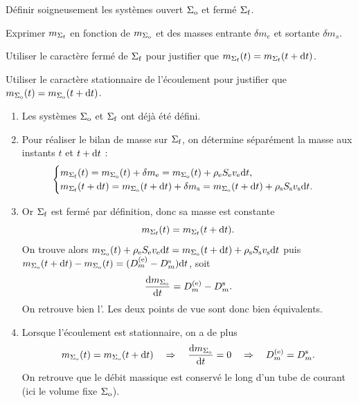 \documentclass[12pt,fancy]{cours}
\begin{document}

\begin{methode}
	\item Définir soigneusement les systèmes ouvert $\Sigma_{\rm o}$ et fermé $\Sigma_{\rm f}$.
	\item Exprimer $m_{\Sigma_{\rm f}}$ en fonction de $m_{\Sigma_{\rm o}}$ et des masses entrante $\delta m_e$ et sortante $\delta m_s$.
	\item Utiliser le caractère fermé de $\Sigma_{\rm f}$ pour justifier que $m_{\Sigma_{\rm f}}(t)= m_{\Sigma_{\rm f}}(t+\mathrm{d} t)$.
	\item Utiliser le caractère stationnaire de l'écoulement pour justifier que $m_{\Sigma_{\rm o}}(t)= m_{\Sigma_{\rm o}}(t+\mathrm{d} t)$.
\end{methode}
\begin{enumerate}
	\item Les systèmes $\Sigma_{\rm o}$ et $\Sigma_{\rm f}$ ont déjà été défini.
	\item Pour réaliser le bilan de masse sur $\Sigma_{\rm f}$, on détermine séparément la masse aux instants $t$ et $t+\mathrm{d} t$ : %
	\begin{equation}
	\begin{cases}
	m_{\Sigma_{\rm f}}(t)=m_{\Sigma_{\rm o}}(t)+\delta m_{\rm{e}}=m_{\Sigma_{\rm o}}(t)+\rho_{\rm{e}}S_{\rm{e}}v_{\rm{e}}\mathrm{d} t, \\
	m_{\Sigma_{\rm f}}(t+\mathrm{d} t)=m_{\Sigma_{\rm o}}(t+\mathrm{d} t)+\delta m_{\rm{s}}=m_{\Sigma_{\rm o}}(t+\mathrm{d} t)+\rho_{\rm{s}}S_{\rm{s}}v_{\rm{s}}\mathrm{d} t.
	\end{cases}
	\end{equation}
	\item Or $\Sigma_{\rm f}$ est fermé par définition, donc sa masse est constante
\begin{equation}
	m_{\Sigma_{\rm f}}(t)= m_{\Sigma_{\rm f}}(t+\mathrm{d} t).
\end{equation}
On trouve alors
	$
m_{\Sigma_{\rm o}}(t)+\rho_{\rm{e}}S_{\rm{e}}v_{\rm{e}}\mathrm{d} t = m_{\Sigma_{\rm o}}(t+\mathrm{d} t)+\rho_{\rm{s}}S_{\rm{s}}v_{\rm{s}}\mathrm{d} t
$ puis $m_{\Sigma_{\rm o}}(t+\mathrm{d} t)-m_{\Sigma_{\rm o}}(t) = (D_m^{\rm{(e)}}-D_m^{\rm{s}})\mathrm{d} t$, soit
\begin{equation}
\frac{\mathrm{d} m_{\Sigma_{\rm o}}}{\mathrm{d} t}=D_m^{\rm{(e)}}-D_m^{\rm{s}}.
\end{equation}
On retrouve bien l'. Les deux points de vue sont donc bien équivalents.
\item Lorsque l'écoulement est stationnaire, on a de plus
\begin{equation}
	m_{\Sigma_{\rm o}}(t) = m_{\Sigma_{\rm o}}(t+ \mathrm{d} t) \quad \Rightarrow \quad \frac{\mathrm{d} m_{\Sigma_{\rm o}}}{\mathrm{d} t}=0 \quad \Rightarrow \quad D_m^{\rm{(e)}}=D_m^{\rm{s}}.
\end{equation}
On retrouve que le débit massique est conservé le long d'un tube de courant (ici le volume fixe $\Sigma_{\rm o}$).
\end{enumerate}
\end{document}
